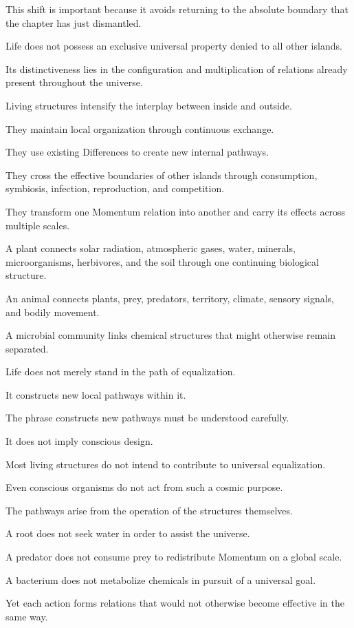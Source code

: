 This shift is important because it avoids returning to the absolute boundary that the chapter has just dismantled.

Life does not possess an exclusive universal property denied to all other islands.

Its distinctiveness lies in the configuration and multiplication of relations already present throughout the universe.

Living structures intensify the interplay between inside and outside.

They maintain local organization through continuous exchange.

They use existing Differences to create new internal pathways.

They cross the effective boundaries of other islands through consumption, symbiosis, infection, reproduction, and competition.

They transform one Momentum relation into another and carry its effects across multiple scales.

A plant connects solar radiation, atmospheric gases, water, minerals, microorganisms, herbivores, and the soil through one continuing biological structure.

An animal connects plants, prey, predators, territory, climate, sensory signals, and bodily movement.

A microbial community links chemical structures that might otherwise remain separated.

Life does not merely stand in the path of equalization.

It constructs new local pathways within it.

The phrase constructs new pathways must be understood carefully.

It does not imply conscious design.

Most living structures do not intend to contribute to universal equalization.

Even conscious organisms do not act from such a cosmic purpose.

The pathways arise from the operation of the structures themselves.

A root does not seek water in order to assist the universe.

A predator does not consume prey to redistribute Momentum on a global scale.

A bacterium does not metabolize chemicals in pursuit of a universal goal.

Yet each action forms relations that would not otherwise become effective in the same way.

